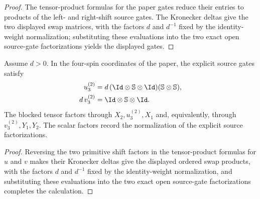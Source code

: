 \begin{proof}\leanok
    The tensor-product formulas for the paper gates reduce their entries to
    products of the left- and right-shift source gates. The Kronecker deltas
    give the two displayed swap matrices, with the factors $d$ and $d^{-1}$
    fixed by the identity-weight normalization; substituting these evaluations
    into the two exact open source-gate factorizations yields the displayed gates.
\end{proof}

\begin{lemma}
    \label{thm:threeMPU_U3_supplied_source_gates_two}
    \leanok
    Assume $d>0$. In the four-spin coordinates of the paper, the explicit
    source gates satisfy
    \begin{align}
        u_3^{(2)}    & =d\,(\Id\otimes\mathbb S\otimes\Id)
        (\mathbb S\otimes\mathbb S),                       \\
        d\,v_3^{(2)} & =\Id\otimes\mathbb S\otimes\Id.
    \end{align}
    The blocked tensor factors through $X_2,u_3^{(2)},X_1$ and, equivalently,
    through $v_3^{(2)},Y_1,Y_2$. The scalar factors record the normalization of
    the explicit source factorizations.
\end{lemma}

\begin{proof}\leanok
    Reversing the two primitive shift factors in the tensor-product formulas for
    $u$ and $v$ makes their Kronecker deltas give the displayed ordered swap products,
    with the factors $d$ and $d^{-1}$ fixed by the identity-weight normalization, and
    substituting these evaluations into the two exact open source-gate
    factorizations completes the calculation.
\end{proof}

